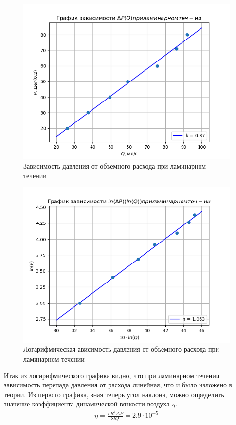 \begin{figure}[h!]
    \centering
    \includegraphics[width=12cm]{plot1.png}
    \caption{Зависимость давления от объемного расхода 
    при ламинарном течении}
    \label{fig:plot1}
\end{figure}

\begin{figure}[h!]
    \centering
    \includegraphics[width=12cm]{plot1ln.png}
    \caption{Логарифмическая ависимость давления от объемного расхода 
    при ламинарном течении}
    \label{fig:plot1ln}
\end{figure}

Итак из логирифмического графика видно, что при ламинарном течении
зависимость перепада давления от расхода линейная, что и было изложено 
в теории. Из первого графика, зная теперь угол наклона, можно определить 
значение коэффициента динамической вязкости воздуха $\eta$.
\begin{align}
    \eta = \frac{\pi R^4 \Delta P}{8 l Q} = 2.9 \cdot 10^{-5}
\end{align}

